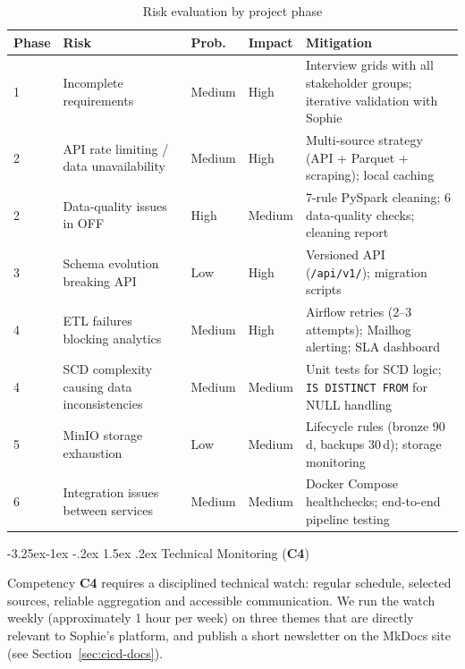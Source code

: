 \documentclass[a4paper,11pt,oneside,openany]{report}
\makeatletter
\renewcommand\subsection{\@startsection{subsection}{2}{\z@}%
  {-3.25ex\@plus -1ex \@minus -.2ex}%
  {1.5ex \@plus .2ex}%
  {\normalfont\large\bfseries\color{ntdarkgreen}}}
\newcommand{\competence}[1]{\textbf{\textcolor{ntgreen}{#1}}}
\makeatother
\begin{document}
\begin{table}[H]
\centering
\caption{Risk evaluation by project phase}
\label{tab:risks}
\begin{tabularx}{\textwidth}{C{1cm} L{3.5cm} C{1.2cm} C{1.2cm} L{4.5cm}}
\toprule
\textbf{Phase} & \textbf{Risk} & \textbf{Prob.} & \textbf{Impact} & \textbf{Mitigation} \\
 & Incomplete requirements & Medium & High & Interview grids with all stakeholder groups; iterative validation with Sophie \\
2 & API rate limiting / data unavailability & Medium & High & Multi-source strategy (API + Parquet + scraping); local caching \\
2 & Data-quality issues in OFF & High & Medium & 7-rule PySpark cleaning; 6 data-quality checks; cleaning report \\
3 & Schema evolution breaking API & Low & High & Versioned API (\texttt{/api/v1/}); migration scripts \\
4 & ETL failures blocking analytics & Medium & High & Airflow retries (2--3 attempts); Mailhog alerting; SLA dashboard \\
4 & SCD complexity causing data inconsistencies & Medium & Medium & Unit tests for SCD logic; \texttt{IS DISTINCT FROM} for NULL handling \\
5 & MinIO storage exhaustion & Low & Medium & Lifecycle rules (bronze 90\,d, backups 30\,d); storage monitoring \\
6 & Integration issues between services & Medium & Medium & Docker Compose healthchecks; end-to-end pipeline testing \\
\bottomrule
\end{tabularx}
\end{table}

\subsection{Technical Monitoring (\competence{C4})}

Competency \competence{C4} requires a disciplined technical watch:
regular schedule, selected sources, reliable aggregation and
accessible communication. We run the watch weekly (approximately
1 hour per week) on three themes that are directly relevant to
Sophie's platform, and publish a short newsletter on the MkDocs
site (see Section~\ref{sec:cicd-docs}).
\end{document}
